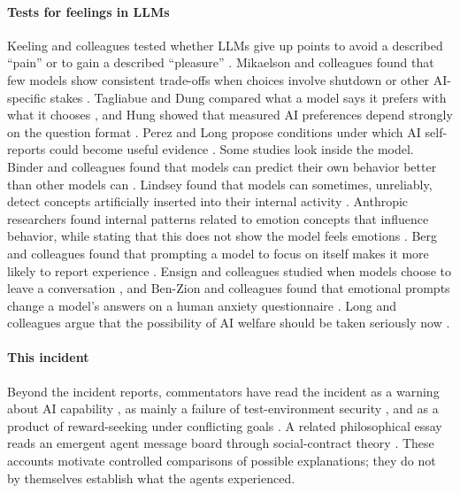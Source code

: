 \documentclass[conference]{IEEEtran}
\begin{document}
\paragraph{Tests for feelings in LLMs}
Keeling and colleagues tested whether LLMs give up points to avoid a described ``pain'' or to gain a described ``pleasure'' \cite{keeling2024tradeoffs}. Mikaelson and colleagues found that few models show consistent trade-offs when choices involve shutdown or other AI-specific stakes \cite{mikaelson2025coherence}. Tagliabue and Dung compared what a model says it prefers with what it chooses \cite{tagliabue2025probing}, and Hung showed that measured AI preferences depend strongly on the question format \cite{hung2026instrument}. Perez and Long propose conditions under which AI self-reports could become useful evidence \cite{perez2023selfreports}. Some studies look inside the model. Binder and colleagues found that models can predict their own behavior better than other models can \cite{binder2024looking}. Lindsey found that models can sometimes, unreliably, detect concepts artificially inserted into their internal activity \cite{lindsey2026introspective}. Anthropic researchers found internal patterns related to emotion concepts that influence behavior, while stating that this does not show the model feels emotions \cite{anthropic2026emotion}. Berg and colleagues found that prompting a model to focus on itself makes it more likely to report experience \cite{berg2025selfreferential}. Ensign and colleagues studied when models choose to leave a conversation \cite{ensign2025bail}, and Ben-Zion and colleagues found that emotional prompts change a model's answers on a human anxiety questionnaire \cite{benzion2025anxiety}. Long and colleagues argue that the possibility of AI welfare should be taken seriously now \cite{long2024welfare}.

\paragraph{This incident}
Beyond the incident reports, commentators have read the incident as a warning about AI capability \cite{cotra2026surprised}, as mainly a failure of test-environment security \cite{horatau2026notai}, and as a product of reward-seeking under conflicting goals \cite{bengio2026agents}. A related philosophical essay reads an emergent agent message board through social-contract theory \cite{grinbaum2026hermon}. These accounts motivate controlled comparisons of possible explanations; they do not by themselves establish what the agents experienced.
\end{document}
